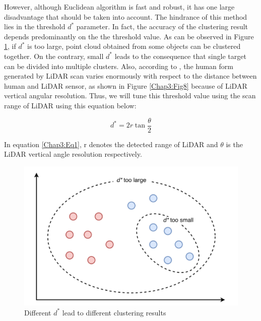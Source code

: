 However, although Euclidean algorithm is fast and robust, it has one large disadvantage
that should be taken into account. The hindrance of this method lies in the threshold
$d^*$ parameter. In fact, the accuracy of the clustering result depends predominantly on the the threshold
value. As can be observed in Figure \ref{Chap3:Fig7}, if $d^*$ is too large, point cloud obtained
from some objects can be clustered together. On the contrary, small $d^*$ leads to the consequence
that single target can be divided into multiple clusters. Also, according to \cite{online_learning}, the
human form generated by LiDAR scan varies enormously with respect to the distance between human and LiDAR sensor, as
shown in Figure \ref{Chap3:Fig8} because of LiDAR vertical angular resolution. Thus, we will
tune this threshold value using the scan range of LiDAR \cite{online_learning} using this equation below:

\begin{equation}
    \label{Chap3:Eq1}
    d^* = 2r \tan \frac{\theta}{2}
\end{equation}

In equation \ref{Chap3:Eq1}, r denotes the detected range of LiDAR and $\theta$ is the LiDAR vertical
angle resolution respectively.

\begin{figure}[h]
    \centering
    \includegraphics[scale=0.5]{figures/chap3_fig/euclidean/3_2_1.png}
    \caption{Different $d^*$ lead to different clustering results  \cite{online_learning,online_learning_2020}}
    \label{Chap3:Fig7}
\end{figure}

